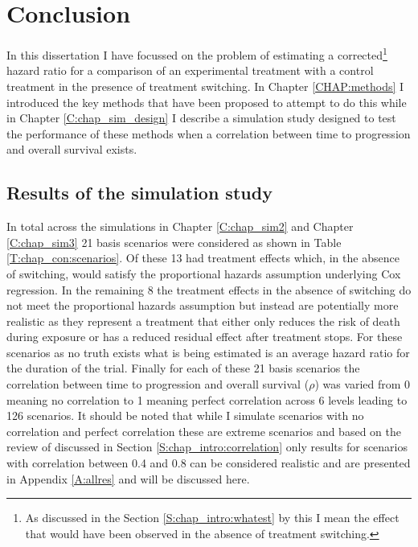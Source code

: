 \chapter{Conclusion}
\label{CHAP:conclusions}

In this dissertation I have focussed on the problem of estimating a corrected\footnote{As discussed in the Section \ref{S:chap_intro:whatest} by this I mean the effect that would have been observed in the absence of treatment switching.} hazard ratio for a comparison of an experimental treatment with a control treatment in the presence of treatment switching. In Chapter \ref{CHAP:methods} I introduced the key methods that have been proposed to attempt to do this while in Chapter \ref{C:chap_sim_design} I describe a simulation study designed to test the performance of these methods when a correlation between time to progression and overall survival exists. 

\section{Results of the simulation study}

In total across the simulations in Chapter \ref{C:chap_sim2} and Chapter \ref{C:chap_sim3} 21 basis scenarios were considered as shown in Table \ref{T:chap_con:scenarios}. Of these 13 had treatment effects which, in the absence of switching, would satisfy the proportional hazards assumption underlying Cox regression. In the remaining 8 the treatment effects in the absence of switching do not meet the proportional hazards assumption but instead are potentially more realistic as they represent a treatment that either only reduces the risk of death during exposure or has a reduced residual effect after treatment stops. For these scenarios as no truth exists what is being estimated is an average hazard ratio for the duration of the trial. Finally for each of these 21 basis scenarios the correlation between time to progression and overall survival ($\rho$) was varied from 0 meaning no correlation to 1 meaning perfect correlation across 6 levels leading to 126 scenarios. It should be noted that while I simulate scenarios with no correlation and perfect correlation these are extreme scenarios and based on the review of \cite{Ciani2014} discussed in Section \ref{S:chap_intro:correlation} only results for scenarios with correlation between 0.4 and 0.8 can be considered realistic and are presented in Appendix \ref{A:allres} and will be discussed here.

